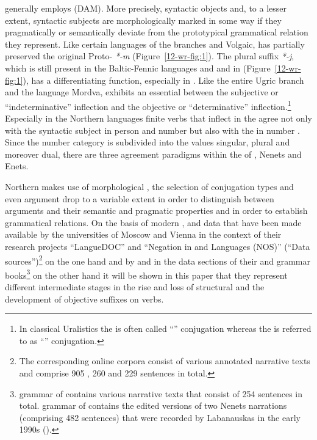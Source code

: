 \documentclass[output=paper]{LSP/langsci}
\begin{document}
\newpage
{} generally employs  (DAM). More precisely, syntactic objects and, to a lesser extent, syntactic subjects are morphologically marked in some way if they pragmatically or semantically deviate from the prototypical grammatical relation they represent. Like certain languages of the  branches  and Volgaic, 
has partially preserved the original Proto-  \textit{*-m} (\cf Figure~\ref{12-wr-fig:1}). The plural suffix \textit{*-j}, which is still present in the Baltic-Fennic languages  and  and in  (\cf Figure~\ref{12-wr-fig:1}), has a differentiating function,  especially in . Like the entire Ugric branch and the  language Mordva,   exhibits an essential  between the subjective or “indeterminative” inflection and the objective or “determinative” inflection.\footnote{In classical Uralistics the  is often called “” conjugation whereas the  is referred to as “” conjugation.} Especially in the Northern  languages finite verbs that inflect in the  agree not only with the syntactic subject in person and number but also with the  in number \citep[27--30]{Abondolo1998Uralic}. Since the  number category is subdivided into the values singular, plural and moreover dual, there are three agreement paradigms within the  of , Nenets and Enets.

Northern  makes use of morphological , the selection of conjugation types and even argument drop to a variable extent in order to distinguish between arguments and their semantic and pragmatic properties and in order to establish grammatical relations. On the basis of modern ,  and  data that have been made available by the universities of Moscow and Vienna in the context of their research projects “LangueDOC” and “Negation in  and  Languages (NOS)” (\cf “Data sources”)\footnote{The corresponding online corpora consist of various annotated narrative texts and comprise 905 , 260  and 229  sentences in total.} on the one hand and by \citet{Siegl2013Materials} and \citet{Nikolaeva2014Grammar} in the data sections of their  and  grammar books\footnote{ grammar of  contains various narrative texts that consist of 254  sentences in total.  grammar of  contains the edited versions of two Nenets narrations (comprising 482 sentences) that were recorded by Labanauskas in the early 1990s (\cf \citealt{Labanauskas1995Neneckij}).} on the other hand it will be shown in this paper that they represent different intermediate stages in the rise and loss of structural  and the development of objective suffixes on verbs. 
\end{document}
